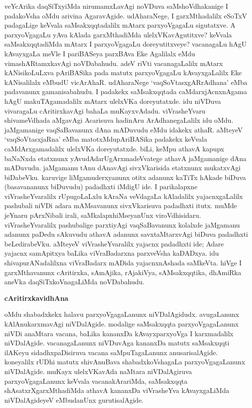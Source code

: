 veYcArika daqSiTxyiMda nirumamxLavAgi noVDuva saMshoVdhakanige I padakoVsha oMdu arivina AgaravAgide. udAharaNege, I garxMthadalilx eSoTxV padagaLige keVvala saMsakxqqtadalilx mAtarx parxyoVgagaLu sigutatxve. A parxyoVgagaLu yAva kAlada garxMthadiMda ulelxVKavAgutitxve? keVvala saMsakxqqtadiMda mAtarx I parxyoVgagaLu doreyutitxveye? vacanagaLu hAgU kAvayxgaLa meVle I pariBASeya parxBAva Eke Agalilalx eMdu vimashARtamxkavAgi noVDabahudu. adeV riVti vacanagaLalilx mAtarx kANisikoLuLxva pAriBASika pada matutx parxyoVgagaLu kAvayxgaLalilx Eke kANisalilalx eMbudU vicArAhaR. udAharaNege `vaqSoVtasxgARrAdhana' eMba padavanunx gamanisabahudu. I padakekx saMsakxqqtada caMdarxjAcnxnAgama hAgU makuTAgamadalilx mAtarx ulelxVKa doreyutatxde. idu niVDuva vivaragaLu cAritirxkavAgi bahaLa muKayxvAdadu. viVrasheYvaru shivameVdhada aMgavAgi Acarisuva hadinAru ArAdhanegaLalilx idu oMdu. jaMgamanige vaqSaBavanunx dAna mADuvudu eMdu idakekx athaR. aMteyeV `vaqSoVtasxjaRna' eMba matotxMdu\break pAriBASika padakekx keVvala caMdArxgamadalilx ulelxVKa doreyutatxde. biLi, keMpu athavA kapupx baNaNxda etatxnunx yAvudAdarU\break gArxmadeVvatege athavA jaMgamanige dAna mADuvudu. jaMgamanu tAnu dAnavAgi sivxVkarisida etatxnunx mukatxvAgi biDabeVku. karuvige liMgamuderxyanunx otitx adanunx kaTiTx hAkade biDuva (basavananunx biDuvudu) padadhxti iMdigU ide. I parikalapxne viVrasheYvaralilx rUpugoLaLxlu kAraNa veVdagaLa kAladalilx yajacnxgaLalilx pashubali niVDi adara mAMsavanunx sivxVkarisuva padadhxti itutx. muMde jeYnaru pArxNibali irali, saMkalapxhiMseyanUnx viroVdhisidaru. viVrasheYvaralilx pashubalige parxtiyAgi vaqSaBavanunx kolalxde jaMgamanu adanunx paDedu sAkuvudu athavA adanunx savxtaMtarxvAgi biDuva padadhxti beLedirabeVku. aMteyeV viVrasheYvaralilx yajacnx padadhxti ide; Adare yajacnx samApitxya baLika viVraBadarxna parxveVsha kaDADxya. idu shivapurANadalilxna viVraBadarx mADida yajacnxnAshada saMkeVta. hiVge I garxMthavanunx cAritirxka, sAmAjika, rAjakiVya, sAMsakxqqtika, dhAmiRka aneVka daqSiTxkoVnagaLiMda noVDabahudu. 

\smallskip
\begin{center}
\textbf{cAritirxkavidhAna}
\end{center}
\smallskip

oMdu shabadxkekx halavu parxyoVgagaLanunx niVDalAgidudx. avugaLanunx kAlAnukarxmavAgi niVDalAgide. modalige saMsakxqqta parxyoVgagaLanunx niVDi anaMtara vacana, baLika kananxDa kAvayxparxyoVga I karxmadalilx niVDalAgide. vacanagaLanunx niVDuvAga kananxDa matutx saMsakxqqti ilAKeyu sidadhxpaDisiruva vacana saMpuTagaLanunx anusarisalAgide. koneyalilx rUDhi matutx shivAnuBava shabadxkoVshagaLa parxyoVgagaLanunx niVDalAgide. muKayx ulelxVKavAda naMtara niVDalAgiruva parxyoVgagaLanunx keVvala vacanakArariMda, saMsakxqqta shAsatxrXgarxMthadiMda athavA kananxDa viVrasheYva kAvayxgaLiMda niVDalAgideyeV eMbudanUnx  gurutisalAgide.

